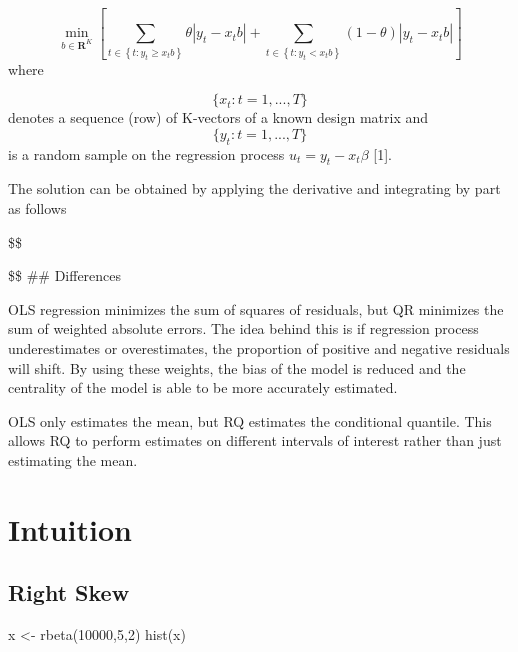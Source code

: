 \documentclass[
  letterpaper,
  DIV=11,
  numbers=noendperiod]{scrreprt}
\newenvironment{Shaded}{\begin{snugshade}}{\end{snugshade}}
\newcommand{\DecValTok}[1]{\textcolor[rgb]{0.68,0.00,0.00}{#1}}
\newcommand{\FunctionTok}[1]{\textcolor[rgb]{0.28,0.35,0.67}{#1}}
\newcommand{\NormalTok}[1]{\textcolor[rgb]{0.00,0.23,0.31}{#1}}
\newcommand{\OtherTok}[1]{\textcolor[rgb]{0.00,0.23,0.31}{#1}}
\begin{document}
\[
\begin{equation}
\min _{b \in \mathbf{R}^K}\left[\sum_{t \in\left\{t: y_t \geqslant x_t b\right\}} \theta\left|y_t-x_t b\right|+\sum_{t \in\left\{t: y_t<x_t b\right\}}(1-\theta)\left|y_t-x_t b\right|\right] 
\end{equation}
\] where

\[
\{x_t: t=1,..., T\}
\] denotes a sequence (row) of K-vectors of a known design matrix and
\[\{y_t: t=1,..., T\}\] is a random sample on the regression process
\(u_t = y_t - x_t\beta\) {[}1{]}.

The solution can be obtained by applying the derivative and integrating
by part as follows

\$\$

\$\$ \#\# Differences

OLS regression minimizes the sum of squares of residuals, but QR
minimizes the sum of weighted absolute errors. The idea behind this is
if regression process underestimates or overestimates, the proportion of
positive and negative residuals will shift. By using these weights, the
bias of the model is reduced and the centrality of the model is able to
be more accurately estimated.

OLS only estimates the mean, but RQ estimates the conditional quantile.
This allows RQ to perform estimates on different intervals of interest
rather than just estimating the mean.

\hypertarget{intuition}{%
\section{Intuition}\label{intuition}}

\hypertarget{right-skew}{%
\subsection{Right Skew}\label{right-skew}}

\begin{Shaded}
\begin{Highlighting}[]
\NormalTok{x }\OtherTok{\textless{}{-}} \FunctionTok{rbeta}\NormalTok{(}\DecValTok{10000}\NormalTok{,}\DecValTok{5}\NormalTok{,}\DecValTok{2}\NormalTok{)}
\FunctionTok{hist}\NormalTok{(x)}
\end{Highlighting}
\end{Shaded}
\end{document}
